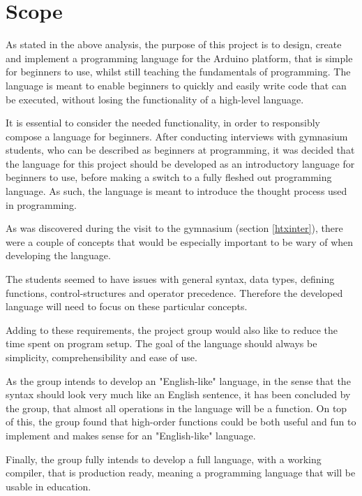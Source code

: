 \section{Scope}
As stated in the above analysis, the purpose of this project is to design, create and implement a programming language for the Arduino platform, that is simple for beginners to use, whilst still teaching the fundamentals of programming.
The language is meant to enable beginners to quickly and easily write code that can be executed, without losing the functionality of a high-level language.

It is essential to consider the needed functionality, in order to responsibly compose a language for beginners.
After conducting interviews with gymnasium students, who can be described as beginners at programming, it was decided that the language for this project should be developed as an introductory language for beginners to use, before making a switch to a fully fleshed out programming language.
As such, the language is meant to introduce the thought process used in programming.

As was discovered during the visit to the gymnasium (section \ref{htxinter}), there were a couple of concepts that would be especially important to be wary of when developing the language.

The students seemed to have issues with general syntax, data types, defining functions, control-structures and operator precedence.
Therefore the developed language will need to focus on these particular concepts. 

Adding to these requirements, the project group would also like to reduce the time spent on program setup.
The goal of the language should always be simplicity, comprehensibility and ease of use.

As the group intends to develop an "English-like" language, in the sense that the syntax should look very much like an English sentence, it has been concluded by the group, that almost all operations in the language will be a function. 
On top of this, the group found that high-order functions could be both useful and fun to implement and makes sense for an "English-like" language. 

Finally, the group fully intends to develop a full language, with a working compiler, that is production ready, meaning a programming language that will be usable in education.

 
